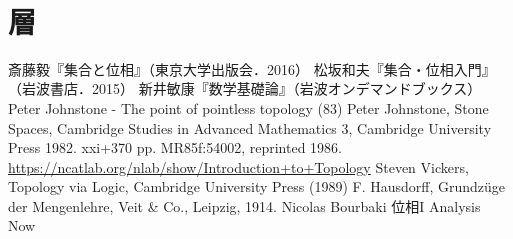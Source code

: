 \documentclass[uplatex,dvipdfmx]{jsreport}
\begin{document}
\begin{example}[定数（前）層：切断の語はこの例に由来する]\mbox{}\\
    
\end{example}

\section{層}\label{sec-sheaf}


\begin{thebibliography}{99}
        斎藤毅『集合と位相』（東京大学出版会．2016）
        松坂和夫『集合・位相入門』（岩波書店．2015）
        新井敏康『数学基礎論』（岩波オンデマンドブックス）
        Peter Johnstone - The point of pointless topology (83)
        Peter Johnstone, Stone Spaces, Cambridge Studies in Advanced Mathematics 3, Cambridge University Press 1982. xxi+370 pp. MR85f:54002, reprinted 1986.
        \url{https://ncatlab.org/nlab/show/Introduction+to+Topology}
        Steven Vickers, Topology via Logic, Cambridge University Press (1989)
    F. Hausdorff, Grundzüge der Mengenlehre, Veit \& Co., Leipzig, 1914.
    Nicolas Bourbaki 位相I
    Analysis Now
\end{thebibliography}
\end{document}
